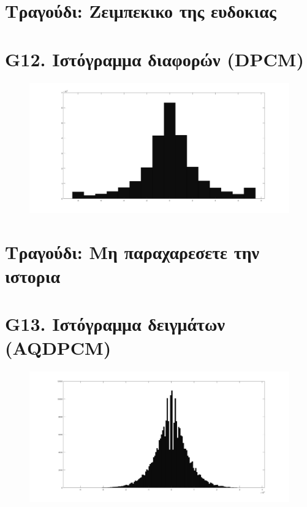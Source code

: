 \documentclass{article}
\begin{document}
\section*{Τραγούδι:  Ζειμπεκικο της ευδοκιας}
\section*{G12. Ιστόγραμμα διαφορών (DPCM) }
\begin{figure}[h!]
 \begin{center}
 \advance\leftskip-6cm
  \includegraphics[width=230mm,scale=0.7]{g12s2.jpg}
\end{center}
\end{figure}
\newpage
\section*{Τραγούδι: Μη παραχαρεσετε την ιστορια}
\section*{G13. Ιστόγραμμα δειγμάτων (AQDPCM) }
\begin{figure}[h!]
 \begin{center}
 \advance\leftskip-6cm
  \includegraphics[width=230mm,scale=0.7]{g13s2.jpg}
\end{center}
\end{figure}
\newpage
\end{document}
